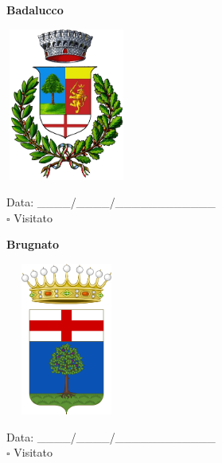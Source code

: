 \documentclass[a5paper,12pt]{article}
\begin{document}
\vspace{0.7cm}

\noindent
\begin{minipage}[t]{0.45\textwidth}
    \begin{center}
        \textbf{Badalucco}
    \end{center}
    \vspace{-0.5cm} %
    \begin{center}
        \includegraphics[height= 5cm, width=4cm]{Liguria/Stemma Badalucco.png}
    \end{center}
    \vspace{-0.4cm} %
    \begin{flushleft}
        Data: \_\_\_\_/\_\_\_\_/\_\_\_\_\_\_\_\_\_\_\_\_ \\
        $\square$ Visitato
    \end{flushleft}
\end{minipage}
\hfill
\noindent
\begin{minipage}[t]{0.45\textwidth}
    \begin{center}
        \textbf{Brugnato}
    \end{center}
    \vspace{-0.5cm} %
    \begin{center}
        \includegraphics[height= 5cm, width=4cm]{Liguria/Stemma Brugnato.png}
    \end{center}
    \vspace{-0.4cm} %
    \begin{flushleft}
        Data: \_\_\_\_/\_\_\_\_/\_\_\_\_\_\_\_\_\_\_\_\_ \\
        $\square$ Visitato
    \end{flushleft}
\end{minipage}
\end{document}
